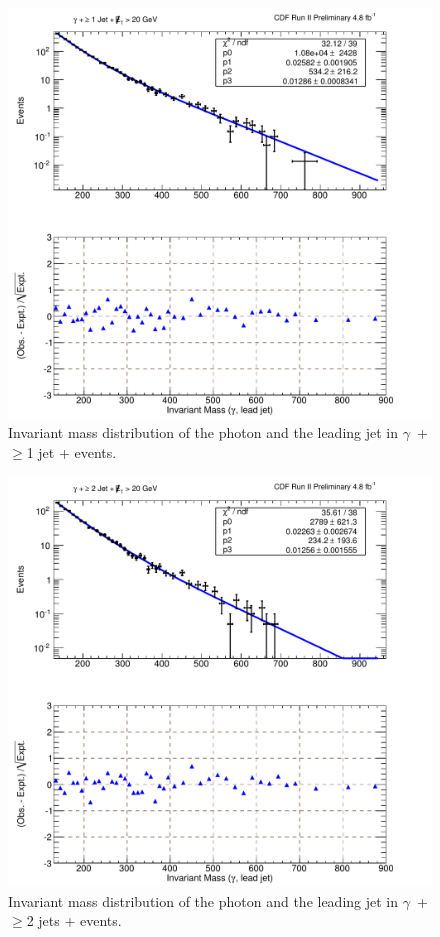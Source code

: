 \begin{figure}[htb!]
\centering
\includegraphics[scale=\resultsMassFitScale,keepaspectratio=true]{gjetsmet_pj1_pj1MassFit.pdf}
\caption{Invariant mass distribution of the photon and the leading jet in $\gamma$~+ $\geq$1 jet +  events.}
\label{fig:MassFit_pj1met_pj}
\end{figure}

 \begin{figure}[htb!]
\centering
\includegraphics[scale=\resultsMassFitScale,keepaspectratio=true]{gjetsmet_pj2_pj1MassFit.pdf}
\caption{Invariant mass distribution of the photon and the leading jet in $\gamma$~+ $\geq$2 jets +  events.}
\label{fig:MassFit_pj2met_pj}
\end{figure}

